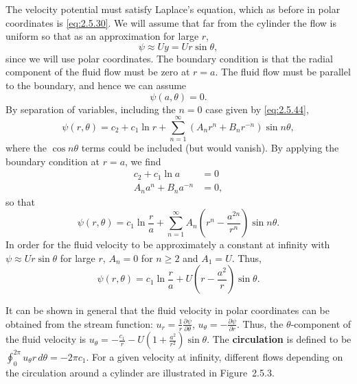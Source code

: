 The velocity potential must satisfy Laplace's equation, which as before in polar coordinates is \eqref{eq:2.5.30}. We will assume that far from the cylinder the flow is uniform so that as an approximation for large $r$,
\begin{equation}
\label{eq:2.5.51}
\psi \approx Uy = Ur\sin\theta,
\end{equation}
since we will use polar coordinates. The boundary condition is that the radial component of the fluid flow must be zero at $r = a$. The fluid flow must be parallel to the boundary, and hence we can assume
\begin{equation}
\label{eq:2.5.52}
\psi(a,\theta) = 0.
\end{equation}
By separation of variables, including the $n = 0$ case given by \eqref{eq:2.5.44},
\begin{equation}
\label{eq:2.5.53}
\psi(r,\theta) = c_2 + c_1\ln r + \sum_{n=1}^{\infty}(A_n r^n + B_n r^{-n})\sin n\theta,
\end{equation}
where the $\cos n\theta$ terms could be included (but would vanish). By applying the boundary condition at $r = a$, we find
\begin{align*}
c_2 + c_1\ln a &= 0 \\
A_n a^n + B_n a^{-n} &= 0,
\end{align*}
so that
\begin{equation}
\label{eq:2.5.54}
\psi(r,\theta) = c_1\ln\frac{r}{a} + \sum_{n=1}^{\infty} A_n\!\left(r^n - \frac{a^{2n}}{r^n}\right)\sin n\theta.
\end{equation}
In order for the fluid velocity to be approximately a constant at infinity with $\psi \approx Ur\sin\theta$ for large $r$, $A_n = 0$ for $n \ge 2$ and $A_1 = U$. Thus,
\begin{equation}
\label{eq:2.5.55}
\boxed{\psi(r,\theta) = c_1\ln\frac{r}{a} + U\!\left(r - \frac{a^2}{r}\right)\sin\theta.}
\end{equation}

It can be shown in general that the fluid velocity in polar coordinates can be obtained from the stream function: $u_r = \frac{1}{r}\frac{\partial\psi}{\partial\theta}$, $u_\theta = -\frac{\partial\psi}{\partial r}$. Thus, the $\theta$-component of the fluid velocity is $u_\theta = -\frac{c_1}{r} - U(1 + \frac{a^2}{r^2})\sin\theta$. The \textbf{circulation} is defined to be $\oint_0^{2\pi} u_\theta r\,d\theta = -2\pi c_1$. For a given velocity at infinity, different flows depending on the circulation around a cylinder are illustrated in Figure~2.5.3.

